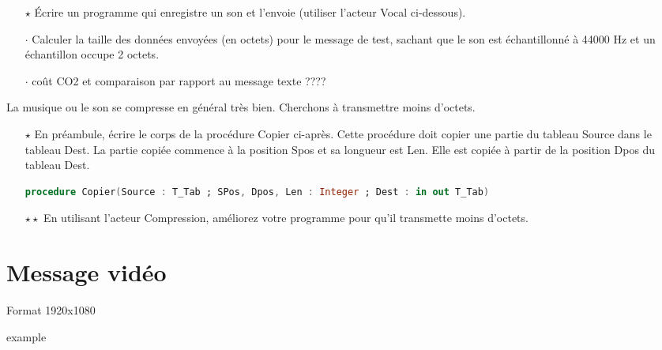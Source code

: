 \documentclass[a4paper]{article}
\begin{document}
\begin{itemize}
\item[$\star$] Écrire un programme qui enregistre un son et l'envoie (utiliser l'acteur Vocal ci-dessous).
\item[$\cdot$] Calculer la taille des données envoyées (en octets) pour le message de test, sachant que le son est échantillonné à 44000 Hz et un échantillon occupe 2 octets.
\item[$\cdot$] coût CO2 et comparaison par rapport au message texte ????
\end{itemize}

La musique ou le son se compresse en général très bien. Cherchons à transmettre moins d'octets.

\begin{itemize}
\item[$\star$] En préambule, écrire le corps de la procédure Copier ci-après. Cette procédure doit copier une partie du tableau Source dans le tableau Dest.
  La partie copiée commence à la position Spos et sa longueur est Len. Elle est copiée à partir de la position Dpos du tableau Dest.

  \begin{lstlisting}[language=Ada]
    procedure Copier(Source : T_Tab ; SPos, Dpos, Len : Integer ; Dest : in out T_Tab) 
  \end{lstlisting}
  
  \item[$\star\star$] En utilisant l'acteur Compression, améliorez votre programme pour qu'il transmette moins d'octets.
  \end{itemize}





\section{Message vidéo}



Format 1920x1080


 example
\end{document}
